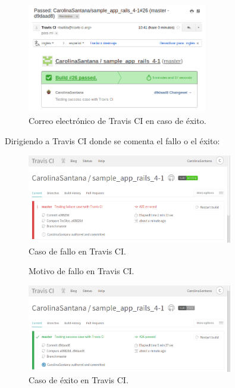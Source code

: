 \begin{figure}[H]
\centering
\includegraphics[width=0.7\textwidth]{images/figures/travissuccess.png}
\caption{Correo electrónico de Travis CI en caso de éxito.}
\end{figure}

Dirigiendo a Travis CI donde se comenta el fallo o el éxito:

\begin{figure}[H]
\centering
\includegraphics[width=0.8\textwidth]{images/figures/travisfailure2.png}
\caption{Caso de fallo en Travis CI.}
\end{figure}

\begin{figure}[H]
\centering
{}
\caption{Motivo de fallo en Travis CI.}
\end{figure}

\begin{figure}[H]
\centering
\includegraphics[width=0.8\textwidth]{images/figures/travissuccess2.png}
\caption{Caso de éxito en Travis CI.}
\end{figure}

